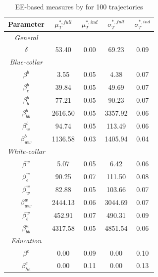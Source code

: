 \newpage
\setlength{\tabcolsep}{22pt} %
\begin{table}[H] 
	\centering
	\begin{threeparttable}
		\caption[Quantitative GSA measures by \cite{ge2017extending}]{EE-based measures by \cite{ge2017extending} for 100 trajectories}
		\label{tab:kw94gm17}
		\renewcommand{\arraystretch}{1.2}%
		\begin{tabular}{cS[table-format=3.2]S[table-format=3.2]@{\hskip 0.7in}|@{\hskip 0.5in}S[table-format=3.2]S[table-format=3.2]}
			
			{Parameter}     & {$\mu^{*,full}_T$}   & {$\mu^{*,ind}_T$} & {$\sigma^{*,full}_T$} & {$\sigma^{*,ind}_T$}\\ \midrule
			\textit{General} \\
			$\delta$ & 53.40   & 0.00 & 69.23 & 0.09   \\    \midrule
			\textit{Blue-collar}\\    
			$\beta^b$ & 3.55   & 0.05            & 4.38 & 0.07    \\
			$\beta_e^b$ & 39.84  &    0.05        & 49.69  & 0.07    \\
			$\beta^b_b$ & 77.21  & 0.05            & 90.23  & 0.07    \\
			$\beta^b_{bb}$ & 2616.50 & 0.05           & 3357.92  & 0.06     \\
			$\beta^b_w$ & 94.74    & 0.05             & 113.49  &  0.06  \\
			$\beta^b_{ww}$ & 1136.58    & 0.03          & 1405.94 &  0.04    \\ \midrule
			\textit{White-collar}\\
			$\beta^w$ & 5.07   & 0.05            & 6.42 &  0.06   \\
			$\beta^w_e$ & 90.25   & 0.07          & 111.50 &  0.08    \\
			$\beta^w_w$ & 82.88  & 0.05            & 103.66 &  0.07   \\
			$\beta^w_{ww}$ & 2444.13  & 0.06           & 3044.69 & 0.07   \\
			$\beta^w_b$ & 452.91 & 0.07           & 490.31 &  0.09   \\
			$\beta^w_{bb}$ & 4317.58 & 0.05         & 4851.54 &  0.06   \\ \midrule
			\textit{Education} \\
			$\beta^e$     & 0.00    & 0.09             & 0.00&  0.10   \\
			$\beta_{he}^e$     & 0.00    & 0.11              & 0.00  & 0.13    \\

\end{tabular}
\end{threeparttable}
\end{table}
